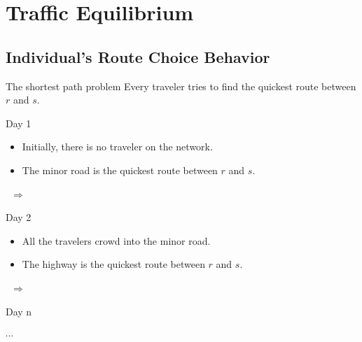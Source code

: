 \documentclass[handout]{beamer}
\begin{document}
\section{Traffic Equilibrium}

\subsection{Individual's Route Choice Behavior}

\begin{frame}{The shortest path problem}
Every traveler tries to find the \alert{quickest route} between $r$ and $s$.\\
\pause
\begin{minipage}{.4\linewidth}
\begin{block}{Day 1}
\begin{figure}
\centering
{}
\end{figure}
\begin{itemize}
	\item Initially, there is no traveler on the network. 
	\item The \alert{minor road} is the quickest route between $r$ and $s$. 
\end{itemize}
\end{block}
\end{minipage}%
\pause
~$\Rightarrow$~%
\begin{minipage}{.4\linewidth}
\begin{block}{Day 2}
\begin{figure}
\centering
{}
\end{figure}
\begin{itemize}
	\item All the travelers crowd into the minor road. 
	\item The \alert{highway} is the quickest route between $r$ and $s$.
\end{itemize}
\end{block}
\end{minipage}%
\pause
~$\Rightarrow$~%
\begin{minipage}{.1\linewidth}
\begin{block}{Day n}
\begin{center}
$\cdots$
\end{center}
\end{block}
\end{minipage}
\end{frame}
\end{document}
